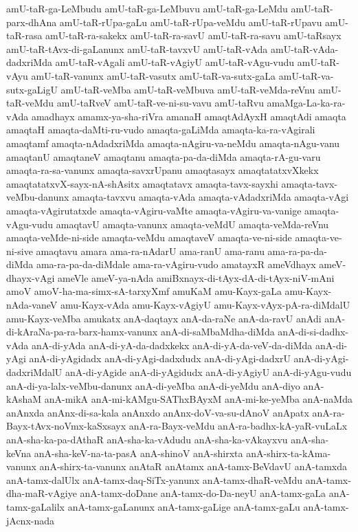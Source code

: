 {amU-taR-ga-LeMbudu
amU-taR-ga-LeMbuvu
amU-taR-ga-LeMdu
amU-taR-parx-dhAna
amU-taR-rUpa-gaLu
amU-taR-rUpa-veMdu
amU-taR-rUpavu
amU-taR-rasa
amU-taR-ra-sakekx
amU-taR-ra-savU
amU-taR-ra-savu
amU-taRsayx
amU-taR-tAvx-di-gaLanunx
amU-taR-tavxvU
amU-taR-vAda
amU-taR-vAda-dadxriMda
amU-taR-vAgali
amU-taR-vAgiyU
amU-taR-vAgu-vudu
amU-taR-vAyu
amU-taR-vanunx
amU-taR-vasutx
amU-taR-va-sutx-gaLa
amU-taR-va-sutx-gaLigU
amU-taR-veMba
amU-taR-veMbuva
amU-taR-veMda-reVnu
amU-taR-veMdu
amU-taRveV
amU-taR-ve-ni-su-vavu
amU-taRvu
amaMga-La-ka-ra-vAda
amadhayx
amamx-ya-sha-riVra
amanaH
amaqtAdAyxH
amaqtAdi
amaqta
amaqtaH
amaqta-daMti-ru-vudo
amaqta-gaLiMda
amaqta-ka-ra-vAgirali
amaqtamf
amaqta-nAdadxriMda
amaqta-nAgiru-va-neMdu
amaqta-nAgu-vanu
amaqtanU
amaqtaneV
amaqtanu
amaqta-pa-da-diMda
amaqta-rA-gu-varu
amaqta-ra-sa-vanunx
amaqta-savxrUpanu
amaqtasayx
amaqtatatxvXkekx
amaqtatatxvX-sayx-nA-shAsitx
amaqtatavx
amaqta-tavx-sayxhi
amaqta-tavx-veMbu-danunx
amaqta-tavxvu
amaqta-vAda
amaqta-vAdadxriMda
amaqta-vAgi
amaqta-vAgirutatxde
amaqta-vAgiru-vaMte
amaqta-vAgiru-va-vanige
amaqta-vAgu-vudu
amaqtavU
amaqta-vanunx
amaqta-veMdU
amaqta-veMda-reVnu
amaqta-veMde-ni-side
amaqta-veMdu
amaqtaveV
amaqta-ve-ni-side
amaqta-ve-ni-sive
amaqtavu
amara
ama-ra-nAdarU
ama-ranU
ama-ranu
ama-ra-pa-da-diMda
ama-ra-pa-da-diMdale
ama-ra-vAgiru-vudo
amatayxR
ameVdhayx
ameV-dhayx-vAgi
ameVle
ameV-ya-nAda
amiBxnayx-di-tAyx-dA-di-tAyx-niV-mAni
amoV
amoV-ha-ma-simx-sA-tarxyXmf
amuKaM
amu-Kayx-gaLa
amu-Kayx-nAda-vaneV
amu-Kayx-vAda
amu-Kayx-vAgiyU
amu-Kayx-vAyx-pA-ra-diMdalU
amu-Kayx-veMba
amukatx
anA-daqtayx
anA-da-raNe
anA-da-ravU
anAdi
anA-di-kAraNa-pa-ra-barx-hamx-vanunx
anA-di-saMbaMdha-diMda
anA-di-si-dadhx-vAda
anA-di-yAda
anA-di-yA-da-dadxkekx
anA-di-yA-da-veV-da-diMda
anA-di-yAgi
anA-di-yAgidadx
anA-di-yAgi-dadxdudx
anA-di-yAgi-dadxrU
anA-di-yAgi-dadxriMdalU
anA-di-yAgide
anA-di-yAgidudx
anA-di-yAgiyU
anA-di-yAgu-vudu
anA-di-ya-lalx-veMbu-danunx
anA-di-yeMba
anA-di-yeMdu
anA-diyo
anA-kAshaM
anA-mikA
anA-mi-kAMgu-SAThxBAyxM
anA-mi-ke-yeMba
anA-naMda
anAnxda
anAnx-di-sa-kala
anAnxdo
anAnx-doV-va-su-dAnoV
anApatx
anA-ra-Bayx-tAvx-noVmx-kaSxsayx
anA-ra-Bayx-veMdu
anA-ra-badhx-kA-yaR-vuLaLx
anA-sha-ka-pa-dAthaR
anA-sha-ka-vAdudu
anA-sha-ka-vAkayxvu
anA-sha-keVna
anA-sha-keV-na-ta-pasA
anA-shinoV
anA-shirxta
anA-shirx-ta-kAma-vanunx
anA-shirx-ta-vanunx
anAtaR
anAtamx
anA-tamx-BeVdavU
anA-tamxda
anA-tamx-dalUlx
anA-tamx-daq-SiTx-yanunx
anA-tamx-dhaR-veMdu
anA-tamx-dha-maR-vAgiye
anA-tamx-doDane
anA-tamx-do-Da-neyU
anA-tamx-gaLa
anA-tamx-gaLalilx
anA-tamx-gaLanunx
anA-tamx-gaLige
anA-tamx-gaLu
anA-tamx-jAcnx-nada
}
